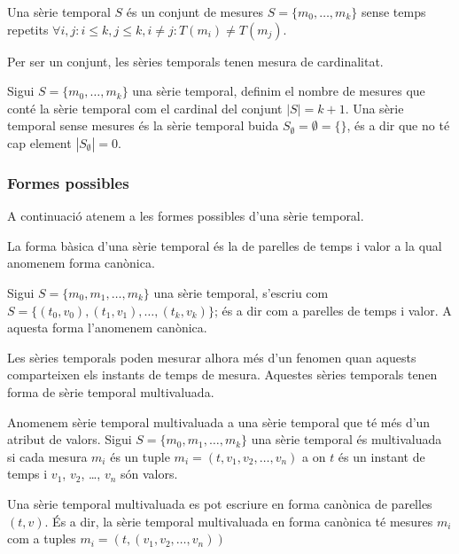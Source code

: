 \begin{definition}
  \label{def:serie_temporal}
  Una sèrie temporal $S$ és un conjunt de mesures
  $S=\{m_0,\ldots,m_k\}$ sense temps repetits
  $\forall i,j: i\leq k, j\leq k, i\neq j : T(m_i)\neq T(m_j)$.
\end{definition}

Per ser un conjunt, les sèries temporals tenen mesura de cardinalitat.
\begin{definition}[Cardinal]
  Sigui $S=\{m_0,\ldots,m_k\}$ una sèrie temporal, definim el nombre
  de mesures que conté la sèrie temporal com el cardinal del conjunt
  $|S|=k+1$. Una sèrie temporal sense mesures és la sèrie temporal
  buida $S_\emptyset= \emptyset = \{\}$, és a dir que no té cap element
  $|S_\emptyset|=0$.
\end{definition}



 
\subsubsection{Formes possibles}

A continuació atenem a les formes possibles d'una sèrie
temporal.

La forma bàsica d'una sèrie temporal és la de parelles de temps i
valor a la qual anomenem forma canònica.

\begin{definition}
  Sigui $S = \{ m_0, m_1 , \dotsc, m_k \}$ una sèrie temporal,
  s'escriu com $S =  \{
  (t_0,v_0), (t_1,v_1), \dotsc, (t_k,v_k)\}$; és
  a dir com a parelles de temps i valor. A aquesta
  forma l'anomenem canònica.
\end{definition}


Les sèries temporals poden mesurar alhora més d'un fenomen quan
aquests comparteixen els instants de temps de mesura. Aquestes sèries
temporals tenen forma de sèrie temporal multivaluada.

\begin{definition}
  Anomenem sèrie temporal multivaluada a una sèrie temporal que té més
  d'un atribut de valors.  Sigui $S = \{ m_0, m_1 , \dotsc, m_k \}$
  una sèrie temporal és multivaluada si cada mesura $m_i$ és un tuple
  $m_i=(t,v_1,v_2,\dotsc,v_n)$ a on $t$ és un instant de temps i
  $v_1$, $v_2$, \dots, $v_n$ són valors. 

  Una sèrie temporal multivaluada es pot escriure en forma canònica de
  parelles $(t,v)$. És a dir, la sèrie temporal multivaluada en
  forma canònica té mesures $m_i$ com a tuples
  $m_i=(t,(v_1,v_2,\dotsc,v_n))$
\end{definition}

